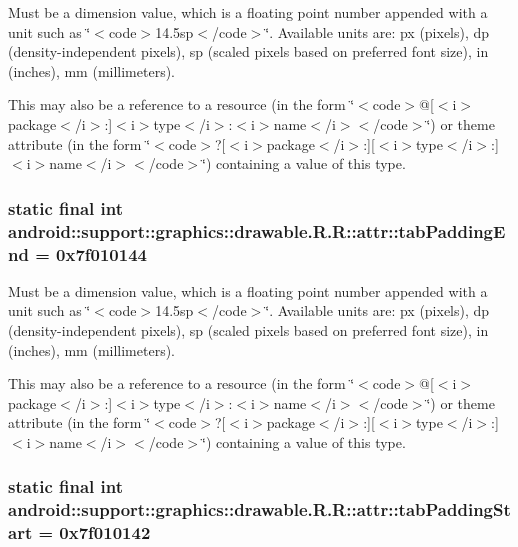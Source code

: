 Must be a dimension value, which is a floating point number appended with a unit such as \char`\"{}$<$code$>$14.5sp$<$/code$>$\char`\"{}. Available units are: px (pixels), dp (density-independent pixels), sp (scaled pixels based on preferred font size), in (inches), mm (millimeters). 

This may also be a reference to a resource (in the form \char`\"{}$<$code$>$@\mbox{[}$<$i$>$package$<$/i$>$:\mbox{]}$<$i$>$type$<$/i$>$:$<$i$>$name$<$/i$>$$<$/code$>$\char`\"{}) or theme attribute (in the form \char`\"{}$<$code$>$?\mbox{[}$<$i$>$package$<$/i$>$:\mbox{]}\mbox{[}$<$i$>$type$<$/i$>$:\mbox{]}$<$i$>$name$<$/i$>$$<$/code$>$\char`\"{}) containing a value of this type. \hypertarget{classandroid_1_1support_1_1graphics_1_1drawable_1_1_r_1_1attr_253a76b0998736685826b3d7fd90af44}{
\subsubsection[{tabPaddingEnd}]{\setlength{\rightskip}{0pt plus 5cm}static final int android::support::graphics::drawable.R.R::attr::tabPaddingEnd = 0x7f010144}}
\label{classandroid_1_1support_1_1graphics_1_1drawable_1_1_r_1_1attr_253a76b0998736685826b3d7fd90af44}


Must be a dimension value, which is a floating point number appended with a unit such as \char`\"{}$<$code$>$14.5sp$<$/code$>$\char`\"{}. Available units are: px (pixels), dp (density-independent pixels), sp (scaled pixels based on preferred font size), in (inches), mm (millimeters). 

This may also be a reference to a resource (in the form \char`\"{}$<$code$>$@\mbox{[}$<$i$>$package$<$/i$>$:\mbox{]}$<$i$>$type$<$/i$>$:$<$i$>$name$<$/i$>$$<$/code$>$\char`\"{}) or theme attribute (in the form \char`\"{}$<$code$>$?\mbox{[}$<$i$>$package$<$/i$>$:\mbox{]}\mbox{[}$<$i$>$type$<$/i$>$:\mbox{]}$<$i$>$name$<$/i$>$$<$/code$>$\char`\"{}) containing a value of this type. \hypertarget{classandroid_1_1support_1_1graphics_1_1drawable_1_1_r_1_1attr_38b04f93c4574faab9907e58d54379f6}{
\subsubsection[{tabPaddingStart}]{\setlength{\rightskip}{0pt plus 5cm}static final int android::support::graphics::drawable.R.R::attr::tabPaddingStart = 0x7f010142}}
\label{classandroid_1_1support_1_1graphics_1_1drawable_1_1_r_1_1attr_38b04f93c4574faab9907e58d54379f6}


